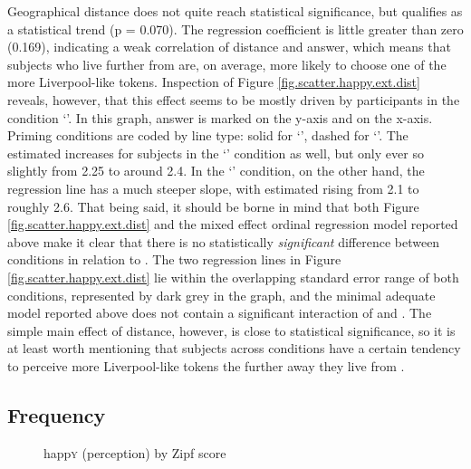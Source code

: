 Geographical distance does not quite reach statistical significance, but qualifies as a statistical trend (p = 0.070).
The regression coefficient is little greater than zero (0.169), indicating a weak correlation of distance and answer, which means that subjects who live further from  are, on average, more likely to choose one of the more Liverpool-like tokens.
Inspection of Figure \ref{fig.scatter.happy.ext.dist} reveals, however, that this effect seems to be mostly driven by participants in the  condition `'.
In this graph, answer is marked on the y-axis and  on the x-axis.
Priming conditions are coded by line type: solid for `', dashed for `'.
The estimated  increases for subjects in the `' condition as well, but only ever so slightly from 2.25 to around 2.4.
In the `' condition, on the other hand, the regression line has a much steeper slope, with estimated  rising from 2.1 to roughly 2.6.
That being said, it should be borne in mind that both Figure \ref{fig.scatter.happy.ext.dist} and the mixed effect ordinal regression model reported above make it clear that there is no statistically \emph{significant} difference between  conditions in relation to .
The two regression lines in Figure \ref{fig.scatter.happy.ext.dist} lie within the overlapping standard error range of both conditions, represented by dark grey in the graph, and the minimal adequate model reported above does not contain a significant interaction of  and .
The simple main effect of distance, however, is close to statistical significance, so it is at least worth mentioning that subjects across conditions have a certain tendency to perceive more Liverpool-like tokens the further away they live from .

\subsection{Frequency}
\label{sec.perc_res.happy.frequency}

\begin{figure}[h]
	\centering
		\resizebox{.49\linewidth}{!}{} 
	\caption{happ\textsc{y} (perception) by Zipf score}
	\label{fig.scatter.happy.ext.zipf}
\end{figure}

